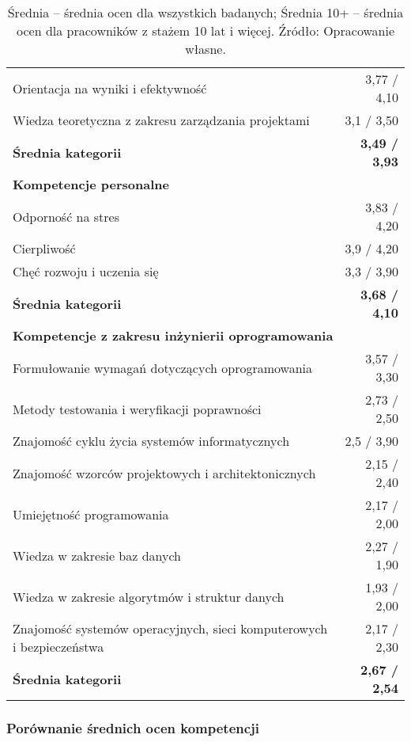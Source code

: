 \begin{table}[htbp]
\begin{tabular}{p{8cm} r}
Orientacja na wyniki i efektywność & 3{,}77 / 4{,}10 \\
Wiedza teoretyczna z zakresu zarządzania projektami & 3{,}1 / 3{,}50 \\
\textbf{Średnia kategorii} & \textbf{3{,}49 / 3{,}93} \\
\midrule
\multicolumn{2}{l}{\textbf{Kompetencje personalne}} \\
Odporność na stres & 3{,}83 / 4{,}20 \\
Cierpliwość & 3{,}9 / 4{,}20 \\
Chęć rozwoju i uczenia się & 3{,}3 / 3{,}90 \\
\textbf{Średnia kategorii} & \textbf{3{,}68 / 4{,}10} \\
\midrule
\multicolumn{2}{l}{\textbf{Kompetencje z zakresu inżynierii oprogramowania}} \\
Formułowanie wymagań dotyczących oprogramowania & 3{,}57 / 3{,}30 \\
Metody testowania i weryfikacji poprawności & 2{,}73 / 2{,}50 \\
Znajomość cyklu życia systemów informatycznych & 2{,}5 / 3{,}90 \\
Znajomość wzorców projektowych i architektonicznych & 2{,}15 / 2{,}40 \\
Umiejętność programowania & 2{,}17 / 2{,}00 \\
Wiedza w zakresie baz danych & 2{,}27 / 1{,}90 \\
Wiedza w zakresie algorytmów i struktur danych & 1{,}93 / 2{,}00 \\
Znajomość systemów operacyjnych, sieci komputerowych i bezpieczeństwa & 2{,}17 / 2{,}30 \\
\textbf{Średnia kategorii} & \textbf{2{,}67 / 2{,}54} \\
\bottomrule
\end{tabular}
\caption*{Średnia – średnia ocen dla wszystkich badanych; Średnia 10+ – średnia ocen dla pracowników z stażem 10 lat i więcej. Źródło: Opracowanie własne.}
\end{table}

\subsubsection{Porównanie średnich ocen kompetencji}

